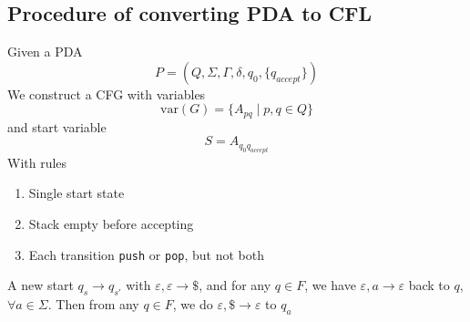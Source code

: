 \subsection{Procedure of converting PDA to CFL}
\begin{proposition}
    Given a PDA
    \[
        P=(Q,\Sigma, \Gamma, \delta, q_0, \{q_{accept}\})
    \]
    We construct a CFG with variables
    \[
        \text{var}(G) =\{A_{pq}\mid p, q \in Q\}
    \]
    and start variable
    \[
        S = A_{q_0 q_{accept}}
    \]
    With rules
    \begin{enumerate}[label=$\arabic*^\circ$]
        \item Single start state
        \item Stack empty before accepting
        \item Each transition \texttt{push} or \texttt{pop}, but not both
    \end{enumerate}
    
    A new start $q_s \rightarrow q_{s'}$ with $\varepsilon, \varepsilon \rightarrow \$ $, and for any $q \in F$, we have $\varepsilon, a\rightarrow \varepsilon $ back to $q$, $\forall a \in \Sigma$. Then from any $q \in F$, we do $\varepsilon, \$ \rightarrow \varepsilon$ to $q_a$
\end{proposition}

\newpage

